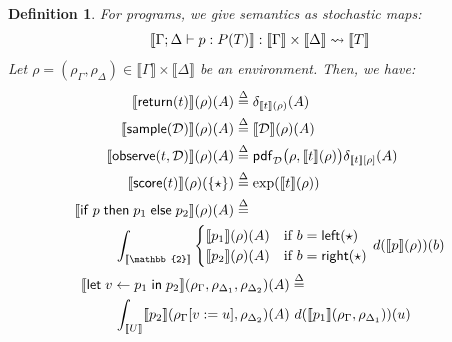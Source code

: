 \documentclass[preprint]{uai2026} %
\newtheorem{definition}{Definition}
\newcommand{\unittype}{\mathbb{1}}
\newcommand{\Bool}{\mathbb{2}}
\newcommand{\sem}[1]{\llbracket #1 \rrbracket}
\newcommand{\kto}{\rightsquigarrow}
\newcommand{\df}{\overset{\Delta}{=}}
\newcommand{\ifte}[3]{\mathsf{if}\;#1\;\mathsf{then}\;#2\;\mathsf{else}\;#3}
\newcommand{\letbind}[3]{\mathsf{let}\;#1\leftarrow #2\;\mathsf{in}\;#3}
\newcommand{\return}[1]{\mathsf{return}(#1)}
\newcommand{\sample}[1]{\mathsf{sample}(#1)}
\newcommand{\observe}[2]{\mathsf{observe}(#1,#2)}
\newcommand{\score}[1]{\mathsf{score}(#1)}
\newcommand{\pdf}{\mathsf{pdf}}
\begin{document}
\begin{definition}\label{def:sem-prog}
For programs, we give semantics as stochastic maps:
\[
\sem{\Gamma;\Delta \vdash p:P(T)} : \sem{\Gamma}\times \sem{\Delta}\kto \sem{T}\\
\]
Let $\rho=(\rho_\Gamma,\rho_\Delta)\in\sem{\Gamma}\times\sem{\Delta}$ be an environment. Then, we have:
\begin{align*}
\sem{\return{t}}(\rho)(A) &\df \delta_{\sem{t}(\rho)}(A) \\
\sem{\sample{\mathcal{D}}}(\rho)(A) &\df \sem{\mathcal{D}}(\rho)(A) \\
\sem{\observe{t}{\mathcal{D}}}(\rho)(A) &\df
\pdf_{\mathcal{D}}\big(\rho, \sem{t}(\rho)\big)  \delta_{\sem{t}[\rho]}(A) \\
\sem{\score{t}}(\rho)(\{\star\}) &\df \exp(\sem{t}(\rho)) \\
\sem{\ifte{p}{p_1}{p_2}}(\rho)(A) &\df\\
&\hspace{-3cm}\int_{\sem{\Bool}}
\begin{cases}
\sem{p_1}(\rho)(A) & \text{if } b=\mathsf{left}(\star)\\
\sem{p_2}(\rho)(A) & \text{if } b=\mathsf{right}(\star)
\end{cases}
\,d(\sem{p}(\rho))(b) \\
\sem{\letbind{v}{p_1}{p_2}}(\rho_\Gamma, \rho_{\Delta_1}&, \rho_{\Delta_2})(A) \df \\
&\hspace{-3cm}
\int_{\sem{U}} \sem{p_2}(\rho_\Gamma[v:=u],\rho_{\Delta_2})(A)\ d(\sem{p_1}(\rho_\Gamma, \rho_{\Delta_1}))(u)
\end{align*}

\end{definition}
\end{document}
